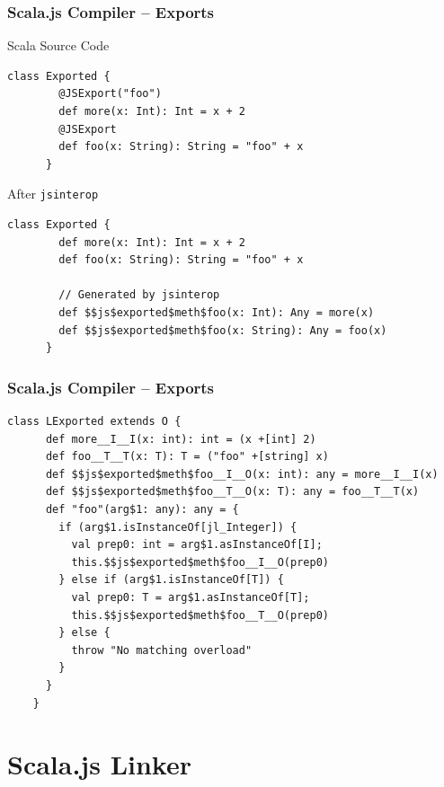 \documentclass{beamer}
\begin{document}
\begin{frame}[fragile]
  \frametitle{Scala.js Compiler -- Exports}

  \begin{block}{Scala Source Code}
    \begin{lstlisting}[gobble=6]
      class Exported {
        @JSExport("foo")
        def more(x: Int): Int = x + 2
        @JSExport
        def foo(x: String): String = "foo" + x
      }
    \end{lstlisting}
  \end{block}

  \pause

  \begin{block}{After \texttt{jsinterop}}
    \begin{lstlisting}[gobble=6]
      class Exported {
        def more(x: Int): Int = x + 2
        def foo(x: String): String = "foo" + x

        // Generated by jsinterop
        def $$js$exported$meth$foo(x: Int): Any = more(x)
        def $$js$exported$meth$foo(x: String): Any = foo(x)
      }
    \end{lstlisting}
  \end{block}

\end{frame}

\begin{frame}[fragile]
  \frametitle{Scala.js Compiler -- Exports}

  \begin{lstlisting}[gobble=4]
    class LExported extends O {
      def more__I__I(x: int): int = (x +[int] 2)
      def foo__T__T(x: T): T = ("foo" +[string] x)
      def $$js$exported$meth$foo__I__O(x: int): any = more__I__I(x)
      def $$js$exported$meth$foo__T__O(x: T): any = foo__T__T(x)
      def "foo"(arg$1: any): any = {
        if (arg$1.isInstanceOf[jl_Integer]) {
          val prep0: int = arg$1.asInstanceOf[I];
          this.$$js$exported$meth$foo__I__O(prep0)
        } else if (arg$1.isInstanceOf[T]) {
          val prep0: T = arg$1.asInstanceOf[T];
          this.$$js$exported$meth$foo__T__O(prep0)
        } else {
          throw "No matching overload"
        }
      }
    }
  \end{lstlisting}

\end{frame}

\section{Scala.js Linker}
\end{document}
